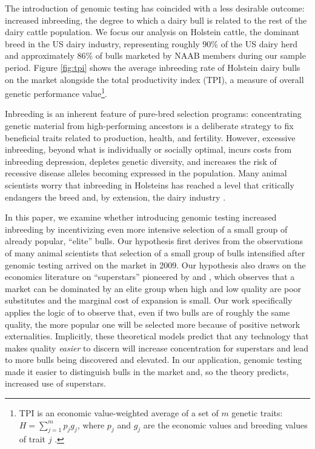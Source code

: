 \documentclass[12pt,letterpaper]{article}
\begin{document}
The introduction of genomic testing has coincided with a less desirable outcome: increased inbreeding, the degree to which a dairy bull is related to the rest of the dairy cattle population. We focus our analysis on Holstein cattle, the dominant breed in the US dairy industry, representing roughly 90\% of the US dairy herd and approximately 86\% of bulls marketed by NAAB members during our sample period. Figure \ref{fig:tpi} shows the average inbreeding rate of Holstein dairy bulls on the market alongside the total productivity index (TPI), a measure of overall genetic performance value\footnote{TPI is an economic value-weighted average of a set of $m$ genetic traits: $H=\sum_{j=1}^{m}p_{j}g_{j}$, where $p_{j}$ and $g_{j}$ are the economic values and breeding values of trait $j$ \citep{Melton_Heady_Willham1979}.}.

Inbreeding is an inherent feature of pure-bred selection programs: concentrating genetic material from high-performing ancestors is a deliberate strategy to fix beneficial traits related to production, health, and fertility. However, excessive inbreeding, beyond what is individually or socially optimal, incurs costs from inbreeding depression, depletes genetic diversity, and increases the risk of recessive disease alleles becoming expressed in the population. Many animal scientists worry that inbreeding in Holsteins has reached a level that critically endangers the breed and, by extension, the dairy industry \citep{Cole2023,makanjuola_effect_2020}.

In this paper, we examine whether introducing genomic testing increased inbreeding by incentivizing even more intensive selection of a small group of already popular, ``elite'' bulls.  Our hypothesis first derives from the observations of many animal scientists \citep{scott_how_2021,howard_invited_2017,Cole2019,makanjuola_effect_2020} that selection of a small group of bulls intensified after genomic testing arrived on the market in 2009. Our hypothesis also draws on the economics literature on ``superstars'' pioneered by \citet{rosen_economics_1981} and \citet{adler1985stardom}, which observes that a market can be dominated by an elite group when high and low quality are poor substitutes and the marginal cost of expansion is small. Our work specifically applies the logic of \citet{adler1985stardom} to observe that, even if two bulls are of roughly the same quality, the more popular one will be selected more because of positive network externalities. Implicitly, these theoretical models predict that any technology that makes quality \textit{easier} to discern will increase concentration for superstars and lead to more bulls being discovered and elevated. In our application, genomic testing made it easier to distinguish bulls in the market and, so the theory predicts, increased use of superstars.
\end{document}
